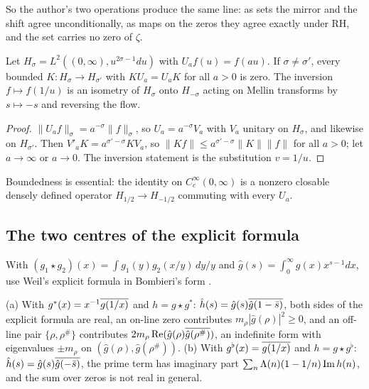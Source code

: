 So the author's two operations produce the same line: as sets the mirror and the shift agree unconditionally, as maps on the zeros they agree exactly under RH, and the set carries no zero of $\zeta$.

\begin{proposition}\label{prop:blind}
Let $H_\sigma=L^2((0,\infty),u^{2\sigma-1}du)$ with $U_af(u)=f(au)$. If $\sigma\ne\sigma'$, every bounded $K:H_\sigma\to H_{\sigma'}$ with $KU_a=U_aK$ for all $a>0$ is zero. The inversion $f\mapsto f(1/u)$ is an isometry of $H_\sigma$ onto $H_{-\sigma}$ acting on Mellin transforms by $s\mapsto-s$ and reversing the flow.
\end{proposition}

\begin{proof}
$\|U_af\|_\sigma=a^{-\sigma}\|f\|_\sigma$, so $U_a=a^{-\sigma}V_a$ with $V_a$ unitary on $H_\sigma$, and likewise on $H_{\sigma'}$. Then $V'_aK=a^{\sigma'-\sigma}KV_a$, so $\|Kf\|\le a^{\sigma'-\sigma}\|K\|\|f\|$ for all $a>0$; let $a\to\infty$ or $a\to0$. The inversion statement is the substitution $v=1/u$.
\end{proof}

Boundedness is essential: the identity on $C_c^\infty(0,\infty)$ is a nonzero closable densely defined operator $H_{1/2}\to H_{-1/2}$ commuting with every $U_a$.

\subsection{The two centres of the explicit formula}

With $(g_1\star g_2)(x)=\int g_1(y)g_2(x/y)\,dy/y$ and $\hat g(s)=\int_0^\infty g(x)x^{s-1}dx$, use Weil's explicit formula in Bombieri's form \cite{Bombieri}.

\begin{proposition}\label{prop:centres}
(a) With $g^*(x)=x^{-1}\overline{g(1/x)}$ and $h=g\star g^*$: $\hat h(s)=\hat g(s)\overline{\hat g(1-\bar s)}$, both sides of the explicit formula are real, an on-line zero contributes $m_\rho|\hat g(\rho)|^2\ge0$, and an off-line pair $\{\rho,\rho^\#\}$ contributes $2m_\rho\operatorname{Re}(\hat g(\rho)\overline{\hat g(\rho^\#)})$, an indefinite form with eigenvalues $\pm m_\rho$ on $(\hat g(\rho),\hat g(\rho^\#))$.
(b) With $g^\flat(x)=\overline{g(1/x)}$ and $h=g\star g^\flat$: $\hat h(s)=\hat g(s)\overline{\hat g(-\bar s)}$, the prime term has imaginary part $\sum_n\Lambda(n)(1-1/n)\operatorname{Im} h(n)$, and the sum over zeros is not real in general.
\end{proposition}

